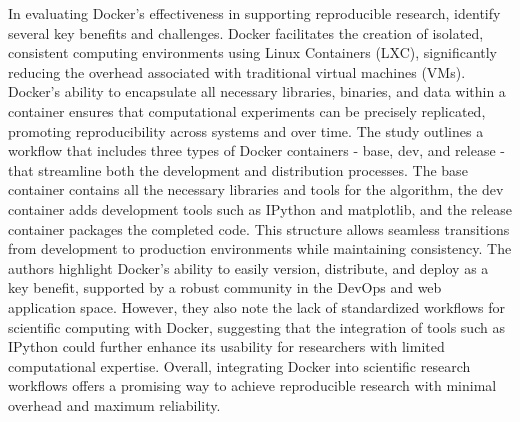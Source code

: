 In evaluating Docker's effectiveness in supporting reproducible research, \citet{chamberlainUsingDockerSupport2014} identify several key benefits and challenges.
Docker facilitates the creation of isolated, consistent computing environments using Linux Containers (LXC), significantly reducing the overhead associated with traditional virtual machines (VMs).
Docker's ability to encapsulate all necessary libraries, binaries, and data within a container ensures that computational experiments can be precisely replicated, promoting reproducibility across systems and over time.
The study outlines a workflow that includes three types of Docker containers - base, dev, and release - that streamline both the development and distribution processes.
The base container contains all the necessary libraries and tools for the algorithm, the dev container adds development tools such as IPython and matplotlib, and the release container packages the completed code.
This structure allows seamless transitions from development to production environments while maintaining consistency.
The authors highlight Docker's ability to easily version, distribute, and deploy as a key benefit, supported by a robust community in the DevOps and web application space.
However, they also note the lack of standardized workflows for scientific computing with Docker, suggesting that the integration of tools such as IPython could further enhance its usability for researchers with limited computational expertise.
Overall, integrating Docker into scientific research workflows offers a promising way to achieve reproducible research with minimal overhead and maximum reliability.

